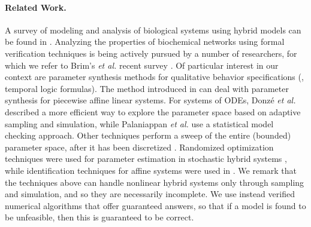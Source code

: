 
\paragraph{Related Work.}
A survey of modeling and analysis of biological systems using hybrid models can be found in \cite{luca08}.
Analyzing the properties of biochemical networks using formal verification techniques is being actively
pursued by a number of researchers, for which we refer to Brim's {\em et al.} recent 
survey \cite{BrimSFM13}.
Of particular interest in our context are parameter synthesis methods for qualitative behavior 
specifications (\eg, temporal logic formulas). The method introduced in \cite{rovergene} can deal 
with parameter synthesis for piecewise affine linear systems. For systems of ODEs, 
Donz\'{e} {\em et al.}~\cite{donze} described a more efficient way to explore the parameter space 
based on adaptive sampling and simulation, while Palaniappan {\em et al.} \cite{liu13} use a statistical 
model checking approach. Other techniques perform a sweep of the entire (bounded) parameter space, 
after it has been discretized \cite{Calzone06,Donaldson08}. Randomized optimization techniques were used
for parameter estimation in stochastic hybrid systems \cite{Koutroumpas08}, while identification
techniques for affine systems were used in \cite{Cinquemani08}.
We remark that the techniques above can handle nonlinear
hybrid systems only through sampling and simulation, and so they are necessarily incomplete. 
We use instead verified numerical algorithms that offer guaranteed answers, so that
if a model is found to be unfeasible, then this is guaranteed to be correct.


